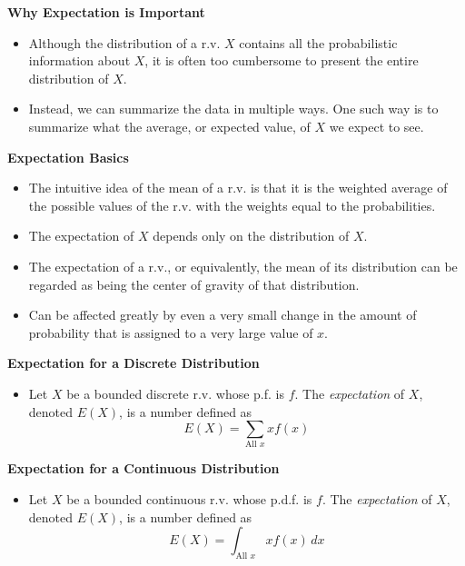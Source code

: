 \documentclass[11pt]{article}
\begin{document}
\textbf{Why Expectation is Important}
\begin{itemize}
    \item Although the distribution of a r.v. $X$ contains all the probabilistic information 
    about $X$, it is often too cumbersome to present the entire distribution of $X$.
    \item Instead, we can summarize the data in multiple ways. One such way is to summarize 
    what the average, or expected value, of $X$ we expect to see.
\end{itemize}

\textbf{Expectation Basics}
\begin{itemize}
    \item The intuitive idea of the mean of a r.v. is that it is the weighted average of the 
    possible values of the r.v. with the weights equal to the probabilities.
    \item The expectation of $X$ depends only on the distribution of $X$.
    \item The expectation of a r.v., or equivalently, the mean of its distribution can be 
    regarded as being the center of gravity of that distribution. 
    \item Can be affected greatly by even a very small change in the amount of probability 
    that is assigned to a very large value of $x$. 
\end{itemize}

\textbf{Expectation for a Discrete Distribution}
\begin{itemize}
    \item Let $X$ be a bounded discrete r.v. whose p.f. is $f$. The \textit{expectation} of 
    $X$, denoted $E(X)$, is a number defined as 
    \[E(X) = \sum_{\text{All } x}x f(x)\]
\end{itemize}

\textbf{Expectation for a Continuous Distribution}
\begin{itemize}
    \item Let $X$ be a bounded continuous r.v. whose p.d.f. is $f$. The \textit{expectation} 
    of $X$, denoted $E(X)$, is a number defined as 
    \[E(X) = \int_{\text{All } x}x f(x) \,dx\]
\end{itemize}
\end{document}
